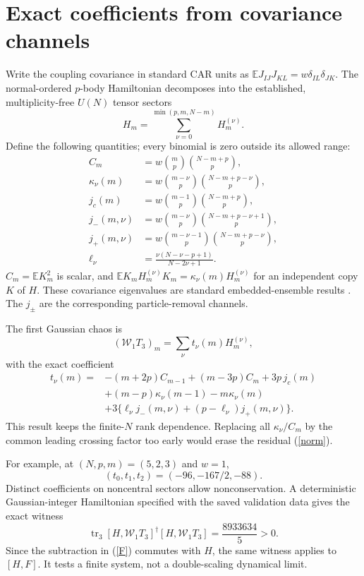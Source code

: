 \documentclass[11pt,a4paper]{article}
\newcommand{\W}{\mathcal W}
\begin{document}
\newpage
\section{Exact coefficients from covariance channels}
Write the coupling covariance in standard CAR units as
$\mathbb E J_{IJ}J_{KL}=w\delta_{IL}\delta_{JK}$.
The normal-ordered $p$-body Hamiltonian decomposes into the
established, multiplicity-free $U(N)$ tensor sectors
\[
 H_m=\sum_{\nu=0}^{\min(p,m,N-m)}H_m^{(\nu)} .
\]
Define the following quantities; every binomial is zero outside
its allowed range:
\begin{align}
 C_m&=w\binom mp\binom{N-m+p}{p},\\
 \kappa_\nu(m)&=w\binom{m-\nu}{p}\binom{N-m+p-\nu}{p},\\
 j_c(m)&=w\binom{m-1}{p}\binom{N-m+p}{p},\\
 j_-(m,\nu)&=w\binom{m-\nu}{p}\binom{N-m+p-\nu+1}{p},\\
 j_+(m,\nu)&=w\binom{m-\nu-1}{p}\binom{N-m+p-\nu}{p},\\
 \ell_\nu&=\frac{\nu(N-\nu-p+1)}{N-2\nu+1}.
\end{align}
$C_m=\mathbb E K_m^2$ is scalar, and
$\mathbb E K_m H_m^{(\nu)}K_m=\kappa_\nu(m)H_m^{(\nu)}$
for an independent copy $K$ of $H$. These covariance eigenvalues
are standard embedded-ensemble results \cite{TT,Kota}.
The $j_\pm$ are the corresponding particle-removal channels.

The first Gaussian chaos is
\begin{equation}
 (\W_1T_3)_m=\sum_\nu t_\nu(m)H_m^{(\nu)},             \label{map}
\end{equation}
with the exact coefficient
\begin{align}
 t_\nu(m)={}&-(m+2p)C_{m-1}+(m-3p)C_m+3p\,j_c(m)
 \nonumber\\
 &+(m-p)\kappa_\nu(m-1)-m\kappa_\nu(m)
 \nonumber\\
 &+3\{\ell_\nu j_-(m,\nu)+(p-\ell_\nu)j_+(m,\nu)\}.
                                                               \label{t}
\end{align}
This result keeps the finite-$N$ rank dependence. Replacing all
$\kappa_\nu/C_m$ by the common leading crossing factor too early
would erase the residual (\ref{norm}).

For example, at $(N,p,m)=(5,2,3)$ and $w=1$,
\[
 (t_0,t_1,t_2)=(-96,-167/2,-88).
\]
Distinct coefficients on noncentral sectors allow nonconservation.
A deterministic Gaussian-integer Hamiltonian specified with the
saved validation data gives the exact witness
\begin{equation}
 \operatorname{tr}_3
 [H,\W_1T_3]^\dagger[H,\W_1T_3]=\frac{8933634}{5}>0. \label{witness}
\end{equation}
Since the subtraction in (\ref{F}) commutes with $H$, the same
witness applies to $[H,F]$. It tests a finite system, not a
double-scaling dynamical limit.
\end{document}

